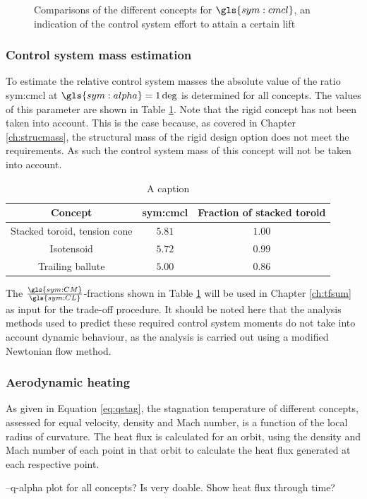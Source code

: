 \begin{figure}[h]
	\centering
	\setlength{} 
	\setlength{}
		
	\caption{Comparisons of the different concepts for $\gls{sym:cmcl}$, an indication of the control system effort to attain a certain lift}
	\label{fig:cmcl}
\end{figure}

\subsubsection{Control system mass estimation}
To estimate the relative control system masses the absolute value of the ratio \gls{sym:cmcl} at $\gls{sym:alpha}=1\deg$ is determined for all concepts. The values of this parameter are shown in Table \ref{tab:controlmass}. Note that the rigid concept has not been taken into account. This is the case because, as covered in Chapter \ref{ch:strucmass}, the structural mass of the rigid design option does not meet the requirements. As such the control system mass of this concept will not be taken into account. 

\begin{table}[h]
	\centering
	\caption{A caption}
	\begin{tabular}{|c|c|c|}
		\hline
		\textbf{Concept} & \textbf{\gls{sym:cmcl}} & \textbf{Fraction of stacked toroid} \\ \hline \hline
		Stacked toroid, tension cone & $5.81$ & $1.00$\\
		Isotensoid & $5.72$ & $0.99$\\
		Trailing ballute & $5.00$ & $0.86$\\
		\hline
	\end{tabular}
	\label{tab:controlmass}
\end{table}

The $\frac{\gls{sym:CM}}{\gls{sym:CL}}$-fractions shown in Table \ref{tab:controlmass} will be used in Chapter \ref{ch:tfsum} as input for the trade-off procedure. It should be noted here that the analysis methods used to predict these required control system moments do not take into account dynamic behaviour, as the analysis is carried out using a modified Newtonian flow method.

\subsubsection{Aerodynamic heating}
As given in Equation \ref{eq:qstag}, the stagnation temperature of different concepts, assessed for equal velocity, density and Mach number, is a function of the local radius of curvature. The heat flux is calculated for an orbit, using the density and Mach number of each point in that orbit to calculate the heat flux generated at each respective point.

--q-alpha plot for all concepts? Is very doable. Show heat flux through time?
